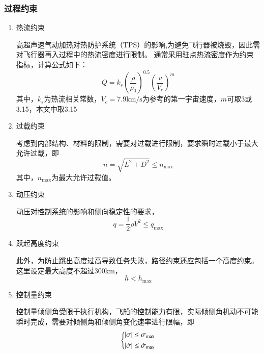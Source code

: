 \subsubsection{过程约束}
\begin{enumerate}
	\item 热流约束\par
	      高超声速气动加热对热防护系统（TPS）的影响,为避免飞行器被烧毁，因此需对飞行器再入过程中的热流密度进行限制。
	      通常采用驻点热流密度作为约束指标，计算公式如下：
	      \begin{equation}
		      \dot{Q} = k_s\left(\frac{\rho}{\rho_{0}}\right)^{0.5}\left(\frac{v}{V_{c}}\right)^{m}
	      \end{equation}
	      其中，$ k_s $为热流相关常数，$ V_c=7.9\mathrm{km/s} $为参考的第一宇宙速度，$ m $可取3或3.15，本文中取3.15
	\item 过载约束\par
	      考虑到内部结构、材料的限制，需要对过载进行限制，要求瞬时过载小于最大允许过载，即
	      \begin{equation}
		      n=\sqrt{{{L}^{2}}+{{D}^{2}}}\le {{n}_{\max }}
	      \end{equation}
	      其中，$ n_{\max} $为最大允许过载值。
	\item 动压约束\par
	      动压对控制系统的影响和侧向稳定性的要求，
	      \begin{equation}
		      q=\frac{1}{2} \rho V^{2} \leq q_{\max }
	      \end{equation}
	\item 跃起高度约束\par
	      此外，为防止跳出高度过高导致任务失败，路径约束还应包括一个高度约束。这里设定最大高度不超过300km，
	      \begin{equation}
		      h<h_{\max}
	      \end{equation}
	\item 控制量约束\par
	      控制量倾侧角受限于执行机构，飞船的控制能力有限，实际倾侧角机动不可能瞬时完成，需要对倾侧角和倾侧角变化速率进行限幅，即
	      \begin{equation}
		      \left\{
		      \begin{aligned}
			      \vert \sigma\vert       & \leq \sigma_{\max}       \\
			      \vert \dot{\sigma}\vert & \leq \dot{\sigma}_{\max} \\
		      \end{aligned} \right.
	      \end{equation}
\end{enumerate}


